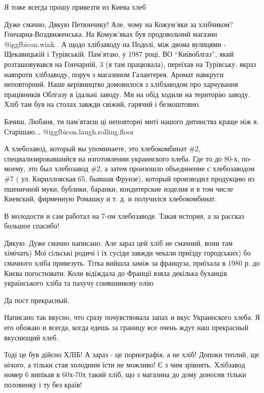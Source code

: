 \begin{itemize}
Я тоже всегда прошу привезти из Киева хлеб


Дуже смачно, Дякую Петюнчику! Але, чому на Кожум'яки за хлібчиком?
Гончарна-Воздвиженська. На Комуж'яках був продовольчий магазин @igg{fbicon.wink} . А щодо
хлібзаводу на Подолі, між двома вулицями - Щекавицькій і Турівській. Пам'ятаю,
у 1987 році, ВО \enquote{Київоблгаз}, який розташовувався на Гончарній, 3 (я там
працювала), переїхав на Турівську, якраз навпроти хлібзаводу, поруч з магазином
Галантерея. Аромат навкруги неповторний. Наше керівництво домовилося з
хлібзаводом про харчування працівників Облгазу в їдальні заводу. Ми на обід
ходили на територію заводу. Хліб там був на столах завжди свіжий, гарячий і
безкоштовно.


Бачиш, Любаня, ти пам'ятаєш ці неповторні миті нашого дитинства краще ніж я.
Старішаю... @igg{fbicon.laugh.rolling.floor} 


А хлебозавод, который вы упоминаете, это хлебокомбинат \#2, специализировавшийся
на изготовлении украинского хлеба. Где то до 80-х, по-моему, это был хлебозавод
\#2, а затем произошло объединение с хлебозаводом \#7 ( ул. Кирилловская 65,
бывшая Фрунзе), который производил продукцию из пшеничной муки, бублики,
баранки, кондитерские изделия и в том числе Киевский, фирменную Ромашку и т. д.
и получился хлебокомбинат.

В молодости и сам работал на 7-ом хлебозаводе. Такая история, а за рассказ
большое спасибо!


Дякую. Дуже смачно написано. Але зараз цей хліб не смачний, вони там хімічать)
Мої сільські родичі і їх сусіди завжди чекали приїзду городських) бо смачного
хліба привезуть. Тітка вийшла заміж за француза, приїхала в 1980 р. до Києва
погостювати. Коли відїждала до Франції взяла декілька буханців українського
хліба та пахучу соняшникову олію

Да пост прекрасный.

Написано так вкусно, что сразу почувствовала запах и вкус Украинского хлеба. Я
его обожаю и всегда, когда едешь за границу все очень ждут наш прекрасный
вкуснющий хлеб.


Тоді це був дійсно ХЛІБ! А зараз - це порнографія, а не хліб! Допоки теплий, ще
нічого, а тільки став холодним їсти не можливо! Є з чим зрівнять. Хлібзавод
номер 6 випікав в 60х-70х такий хліб, що з магазина до дому доносив тільки
половинку і ту без країв!


\end{itemize}
